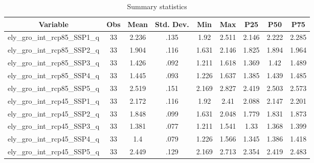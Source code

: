 \begin{table}[htbp]\centering \caption{Summary statistics\label{sumstat}}
\begin{tabular}{l c c c c c c c c}\hline\hline
\multicolumn{1}{c}{Variable} & Obs & Mean & Std. Dev.
 & Min & Max & P25 & P50 & P75  \\ \hline
ely\_gro\_int\_rcp85\_SSP1\_q & 33 & 2.236 & .135 & 1.92 & 2.511 & 2.146 & 2.222 & 2.285 \\
ely\_gro\_int\_rcp85\_SSP2\_q & 33 & 1.904 & .116 & 1.631 & 2.146 & 1.825 & 1.894 & 1.964 \\
ely\_gro\_int\_rcp85\_SSP3\_q & 33 & 1.426 & .092 & 1.211 & 1.618 & 1.369 & 1.42 & 1.489 \\
ely\_gro\_int\_rcp85\_SSP4\_q & 33 & 1.445 & .093 & 1.226 & 1.637 & 1.385 & 1.439 & 1.485 \\
ely\_gro\_int\_rcp85\_SSP5\_q & 33 & 2.519 & .151 & 2.169 & 2.827 & 2.419 & 2.503 & 2.573 \\
ely\_gro\_int\_rcp45\_SSP1\_q & 33 & 2.172 & .116 & 1.92 & 2.41 & 2.088 & 2.147 & 2.201 \\
ely\_gro\_int\_rcp45\_SSP2\_q & 33 & 1.848 & .099 & 1.631 & 2.048 & 1.779 & 1.831 & 1.873 \\
ely\_gro\_int\_rcp45\_SSP3\_q & 33 & 1.381 & .077 & 1.211 & 1.541 & 1.33 & 1.368 & 1.399 \\
ely\_gro\_int\_rcp45\_SSP4\_q & 33 & 1.4 & .079 & 1.226 & 1.566 & 1.345 & 1.386 & 1.418 \\
ely\_gro\_int\_rcp45\_SSP5\_q & 33 & 2.449 & .129 & 2.169 & 2.713 & 2.354 & 2.419 & 2.483 \\
\hline\end{tabular}
\end{table}
